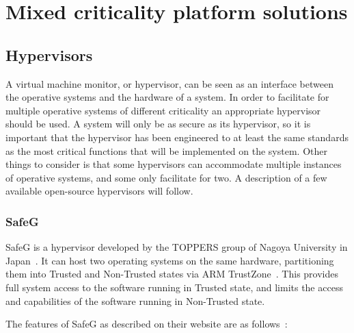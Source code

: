 \section{Mixed criticality platform solutions}

\subsection{Hypervisors}
A virtual machine monitor, or hypervisor, can be seen as an interface between the operative systems and the hardware of a system. In order to facilitate for multiple operative systems of different criticality an appropriate hypervisor should be used. A system will only be as secure as its hypervisor, so it is important that the hypervisor has been engineered to at least the same standards as the most critical functions that will be implemented on the system. Other things to consider is that some hypervisors can accommodate multiple instances of operative systems, and some only facilitate for two. A description of a few available open-source hypervisors will follow.

\subsubsection{SafeG}
SafeG is a hypervisor developed by the TOPPERS group of Nagoya University in Japan~\cite{website:safeg}. It can host two operating systems on the same hardware, partitioning them into Trusted and Non-Trusted states via ARM TrustZone~\cite{website:ARM}. This provides full system access to the software running in Trusted state, and limits the access and capabilities of the software running in Non-Trusted state.

The features of SafeG as described on their website are as follows~\cite{website:safeg}:

